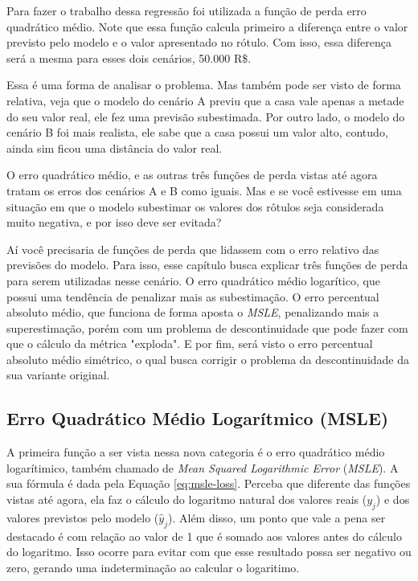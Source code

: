 Para fazer o trabalho dessa regressão foi utilizada a função de perda erro quadrático médio. Note que essa função calcula primeiro a diferença entre o valor previsto pelo modelo e o valor apresentado no rótulo. Com isso, essa diferença será a mesma para esses dois cenários, 50.000 R\$.

Essa é uma forma de analisar o problema. Mas também pode ser visto de forma relativa, veja que o modelo do cenário A previu que a casa vale apenas a metade do seu valor real, ele fez uma previsão subestimada. Por outro lado, o modelo do cenário B foi mais realista, ele sabe que a casa possui um valor alto, contudo, ainda sim ficou uma distância do valor real. 

O erro quadrático médio, e as outras três funções de perda vistas até agora tratam os erros dos cenários A e B como iguais. Mas e se você estivesse em uma situação em que o modelo subestimar os valores dos rôtulos seja considerada muito negativa, e por isso deve ser evitada?

Aí você precisaria de funções de perda que lidassem com o erro relativo das previsões do modelo. Para isso, esse capítulo busca explicar três funções de perda para serem utilizadas nesse cenário. O erro quadrático médio logarítico, que possui uma tendência de penalizar mais as subestimação. O erro percentual absoluto médio, que funciona de forma aposta o \textit{MSLE}, penalizando mais a superestimação, porém com um problema de descontinuidade que pode fazer com que o cálculo da métrica "exploda". E por fim, será visto o erro percentual absoluto médio simétrico, o qual busca corrigir o problema da descontinuidade da sua variante original.

\subsection{Erro Quadrático Médio Logarítmico (MSLE)} 

A primeira função a ser vista nessa nova categoria é o erro quadrático médio logarítimico, também chamado de \textit{Mean Squared Logarithmic Error} (\textit{MSLE}). A sua fórmula é dada pela Equação \ref{eq:msle-loss}. Perceba que diferente das funções vistas até agora, ela faz o cálculo do logaritmo natural dos valores reais ($y_j$) e dos valores previstos pelo modelo ($\hat{y}_j$). Além disso, um ponto que vale a pena ser destacado é com relação ao valor de 1 que é somado aos valores antes do cálculo do logaritmo. Isso ocorre para evitar com que esse resultado possa ser negativo ou zero, gerando uma indeterminação ao calcular o logaritimo.

